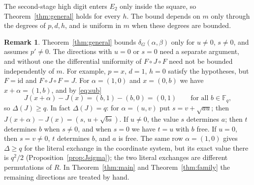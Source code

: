 \documentclass[11pt]{amsart}
\theoremstyle{definition}
\newtheorem{remark}[theorem]{Remark}
\newcommand{\Fq}{\mathbb{F}_q}
\newcommand{\diff}{\delta}
\begin{document}
The second-stage high digit enters $E_2$ only inside the square, so Theorem~\ref{thm:general} holds for every $h$. The bound
depends on $m$ only through the degrees of $p,d,h$, and is uniform in $m$ when these degrees are bounded.

\begin{remark}\label{rem:scope}
Theorem~\ref{thm:general} bounds $\diff_G(\alpha,\beta)$ only for $u\ne0$, $s\ne0$, and assumes $p'\ne0$. The directions with $u=0$ or
$s=0$ need a separate argument, and without one the differential uniformity of $F\circ J\circ F$ need not be bounded independently of
$m$. For example, $p=x$, $d=1$, $h=0$ satisfy the hypotheses, but $F=\mathrm{id}$ and $F\circ J\circ F=J$. For $\alpha=(1,0)$ and
$x=(0,b)$ we have $x+\alpha=(1,b)$, and by \eqref{eq:sub}
\[
J(x+\alpha)-J(x)=(b,1)-(b,0)=(0,1)\qquad\text{for all }b\in\Fq,
\]
so $\Delta(J)\ge q$. In fact $\Delta(J)=q$: for $\alpha=(u,v)$ put $s=v+\sqrt{au}$; then $J(x+\alpha)-J(x)=(s,\,u+\sqrt{bs})$.
If $u\ne0$, the value $s$ determines $a$; then $t$ determines $b$ when $s\ne0$, and when $s=0$ we have $t=u$ with $b$ free. If $u=0$,
then $s=v\ne0$, $t$ determines $b$, and $a$ is free. The same row $\alpha=(1,0)$ gives $\Delta\ge q$ for the literal exchange in the
coordinate system, but its exact value there is $q^2/2$ (Proposition~\ref{prop:Jsigma}); the two literal exchanges are different
permutations of $R$. In
Theorem~\ref{thm:main} and Theorem~\ref{thm:family} the remaining directions are treated by hand.
\end{remark}
\end{document}
